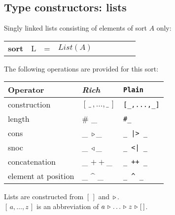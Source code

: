 \documentclass{article}
\makeatletter
\newcommand{\frm}[1]{\mbox{\ensuremath{#1}}}
\newcommand{\f}[1]{\ensuremath{\mathit{#1}}}
\newcommand{\fa}[2]{\ensuremath{\f{#1}(#2)}}
\newcommand{\lst}[1]{\ensuremath{[\,#1\,]}}
\newcommand{\el}{\ensuremath{[\,]}}
\newcommand{\cons}{\ensuremath{\hspace{0.12em}\triangleright\hspace{0.08em}}}
\newcommand{\snoc}{\ensuremath{\hspace{0.08em}\triangleleft\hspace{0.12em}}}
\newcommand{\concat}{\frm{+\!+}}
\newenvironment{mCRL2}%
{\par\bigskip\noindent%
 \begin{tabular}{@{}>{\bf}p{2.3em}L@{\ }L@{\ }L@{\ }L@{\ }L@{\ }L@{\ }L@{\ }L}%
}%
{\end{tabular}\bigskip\par%
}
\makeatother
\begin{document}
\begin{slidetop}
\section*{Type constructors: lists}

Singly linked lists consisting of elements of sort \frm{A} only:
\begin{mCRL2}
sort & L & = & \fa{List}{A}
\end{mCRL2}

\bigskip
The following operations are provided for this sort:
\begin{center}
\begin{tabular}{|l@{\qquad}L@{\qquad}l|}
\hline
Operator                       & \textit{Rich}          & \verb+Plain+\\\hline
construction                   & \lst{\_\,,\ldots,\_}   & \verb+[_,...,_]+\\
length                         & \# \_                  & \verb+#_+\\
cons                           & \_ \cons \_            & \verb+_ |> _+\\
snoc                           & \_ \snoc \_            & \verb+_ <| _+\\
concatenation                  & \_ \concat \_          & \verb-_ ++ _-\\
element at position            & \_ \mbox{\^{}} \_      & \verb+_ ^ _+\\
\hline
\end{tabular}
\end{center}

\bigskip
Lists are constructed from \frm{\el} and \frm{\cons}.\\
\frm{\lst{a, \ldots, z}} is an abbreviation of \frm{a \cons \ldots \cons z \cons \el}.
\end{slidetop}
\end{document}
